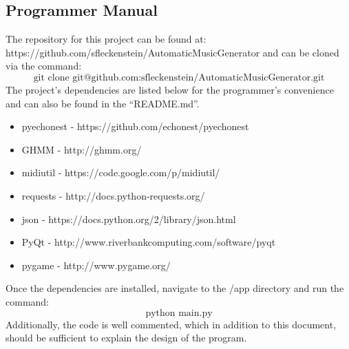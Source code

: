 \documentclass{article}
\begin{document}
\subsection{Programmer Manual}
The repository for this project can be found at: https://github.com/sfleckenstein/AutomaticMusicGenerator and can be cloned via the command:
\[
\text{git clone git@github.com:sfleckenstein/AutomaticMusicGenerator.git}
\]
The project’s dependencies are listed below for the programmer’s convenience and can also be found in the “README.md”.
\begin{itemize}
\item pyechonest - https://github.com/echonest/pyechonest 
\item GHMM - http://ghmm.org/
\item midiutil - https://code.google.com/p/midiutil/ 
\item requests - http://docs.python-requests.org/ 
\item json - https://docs.python.org/2/library/json.html 
\item PyQt - http://www.riverbankcomputing.com/software/pyqt 
\item pygame - http://www.pygame.org/ 
\end{itemize}
Once the dependencies are installed, navigate to the /app directory and run the command:
\[
\text{python main.py}
\]
Additionally, the code is well commented, which in addition to this document, should be sufficient to explain the design of the program.

\newpage





\end{document}
